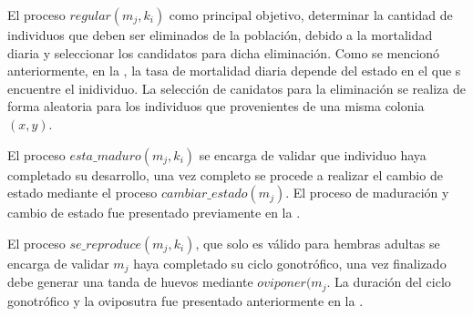 El proceso $regular(m_{j}, k_{i})$ como principal objetivo, determinar la cantidad de individuos
que deben ser eliminados de la población, debido a la mortalidad diaria y seleccionar los
candidatos para dicha eliminación. Como se mencionó anteriormente, en la
, la tasa de mortalidad diaria depende del estado en el que s
encuentre el inidividuo. La selección de canidatos para la eliminación se realiza de forma
aleatoria para los individuos que provenientes de una misma colonia $(x, y)$.


El proceso $esta\_maduro(m_{j}, k_{i})$ se encarga de validar que individuo haya completado su
desarrollo, una vez completo se procede a realizar el cambio de estado mediante el proceso
$cambiar\_estado(m_{j})$. El proceso de maduración y cambio de estado fue presentado previamente
en la .

El proceso $se\_reproduce(m_{j}, k_{i})$, que solo es válido para hembras adultas se encarga de
validar $m_{j}$ haya completado su ciclo gonotrófico, una vez finalizado debe generar una tanda de
huevos mediante $oviponer(m_{j}$. La duración del ciclo gonotrófico y la oviposutra fue presentado
anteriormente en la .
